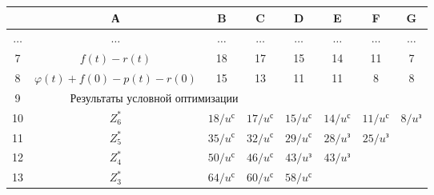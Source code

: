   


  \begin{figure}[b] %


  \vspace*{-6pt}


  {\small \begin{center}


  \tabcolsep=4pt


  \begin{tabular}{|c|c|c|c|c|c|c|c|}


  \hline


\cellcolor[gray]{.9}&\cellcolor[gray]{.9}А&\cellcolor[gray]{.9}B&\cellcolor[gray]{.9}C&


\cellcolor[gray]{.9}D&\cellcolor[gray]{.9}E&\cellcolor[gray]{.9}F&\cellcolor[gray]{.9}G\\


\hline


\cellcolor[gray]{.9}$\ldots$&$\ldots$&$\ldots$&$\ldots$&$\ldots$&$\ldots$&$\ldots$&$\ldots$\\


\cellcolor[gray]{.9}\hphantom{9}7&$f(t) - r(t)$&18&17&15&14&11&7\\


\cellcolor[gray]{.9}\hphantom{9}8&$\varphi (t) + f(0) -p(t) - r(0)$&15&13&11&11&8&8\\


\hline


\cellcolor[gray]{.9}\hphantom{9}9&\multicolumn{3}{c|}{Результаты условной оптимизации}&&&&\\


\hline


\cellcolor[gray]{.9}10&$Z_6^*$&$18/u^{\mathrm{с}}$&$17/u^{\mathrm{с}}$&$15/u^{\mathrm{с}}$&


$14/u^{\mathrm{с}}$&$11/u^{\mathrm{с}}$&$8/u^{\mathrm{з}}$\\


\cellcolor[gray]{.9}11&$Z^*_5$&$35/u^{\mathrm{с}}$&$32/u^{\mathrm{с}}$&$29/u^{\mathrm{с}}$&$28/u^{\mathrm{з}


}$&$25/u^{\mathrm{з}}$&\\


\cellcolor[gray]{.9}12&$Z^*_4$&$50/u^{\mathrm{с}}$&$46/u^{\mathrm{с}}$&$43/u^{\mathrm{з}}$&$


43/u^{\mathrm{з}}$& &\\


\cellcolor[gray]{.9}13&$Z^*_3$&$64/ u^{\mathrm{с}}$&$60/u^{\mathrm{с}}$&$58/u^{\mathrm{с}}$& 



\end{tabular}
\end{center}}
\end{figure}
